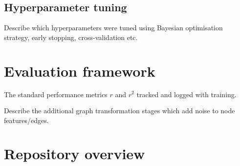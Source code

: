 \subsection{Hyperparameter tuning}
Describe which hyperparameters were tuned using Bayesian optimisation strategy, early stopping, cross-validation etc.


\section{Evaluation framework}
The standard performance metrics $r$ and $r^2$ tracked and logged with training.

Describe the additional graph transformation stages which add noise to node features/edges.


\section{Repository overview}

